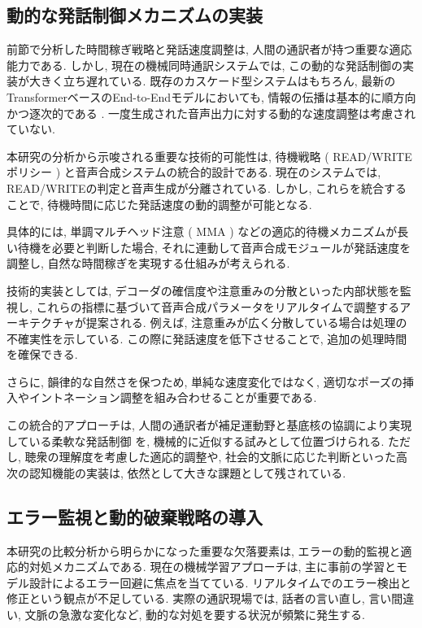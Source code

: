 \subsection{動的な発話制御メカニズムの実装}

前節で分析した時間稼ぎ戦略と発話速度調整は, 人間の通訳者が持つ重要な適応能力である.
しかし, 現在の機械同時通訳システムでは, この動的な発話制御の実装が大きく立ち遅れている.
既存のカスケード型システムはもちろん, 最新のTransformerベースのEnd-to-Endモデルにおいても, 情報の伝播は基本的に順方向かつ逐次的である \cite{liu2024recent}.
一度生成された音声出力に対する動的な速度調整は考慮されていない.

本研究の分析から示唆される重要な技術的可能性は, 待機戦略 ( READ/WRITEポリシー ) と音声合成システムの統合的設計である.
現在のシステムでは, READ/WRITEの判定と音声生成が分離されている.
しかし, これらを統合することで, 待機時間に応じた発話速度の動的調整が可能となる.

具体的には, 単調マルチヘッド注意 ( MMA ) \cite{ma2020monotonic} などの適応的待機メカニズムが長い待機を必要と判断した場合, それに連動して音声合成モジュールが発話速度を調整し, 自然な時間稼ぎを実現する仕組みが考えられる.

技術的実装としては, デコーダの確信度や注意重みの分散といった内部状態を監視し, これらの指標に基づいて音声合成パラメータをリアルタイムで調整するアーキテクチャが提案される.
例えば, 注意重みが広く分散している場合は処理の不確実性を示している.
この際に発話速度を低下させることで, 追加の処理時間を確保できる.

さらに, 韻律的な自然さを保つため, 単純な速度変化ではなく, 適切なポーズの挿入やイントネーション調整を組み合わせることが重要である.

この統合的アプローチは, 人間の通訳者が補足運動野と基底核の協調により実現している柔軟な発話制御 \cite{rinne2000left,hervais2015fmri} を, 機械的に近似する試みとして位置づけられる.
ただし, 聴衆の理解度を考慮した適応的調整や, 社会的文脈に応じた判断といった高次の認知機能の実装は, 依然として大きな課題として残されている.

\subsection{エラー監視と動的破棄戦略の導入}

本研究の比較分析から明らかになった重要な欠落要素は, エラーの動的監視と適応的対処メカニズムである.
現在の機械学習アプローチは, 主に事前の学習とモデル設計によるエラー回避に焦点を当てている.
リアルタイムでのエラー検出と修正という観点が不足している.
実際の通訳現場では, 話者の言い直し, 言い間違い, 文脈の急激な変化など, 動的な対処を要する状況が頻繁に発生する.

